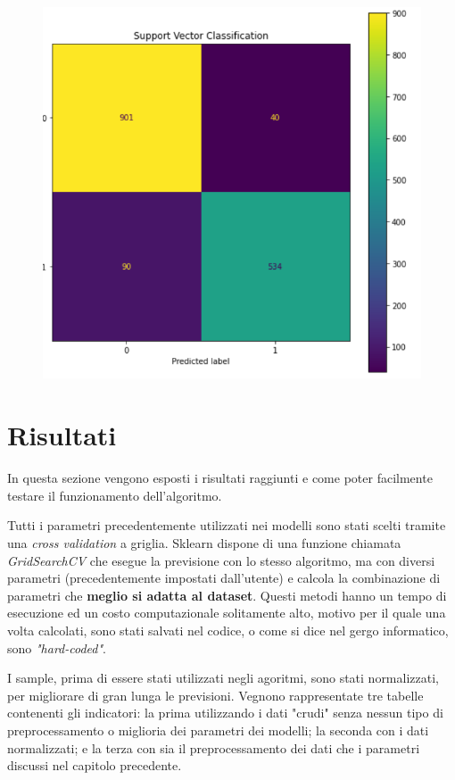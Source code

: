 \documentclass[12pt,a4paper]{article}
\begin{document}
\begin{figure}[th]
\begin{minipage}{0.33\textwidth}
     \caption{}
   \end{minipage}
   \begin{minipage}{0.33\textwidth}
     \centering
     \includegraphics[width=.9\linewidth]{confusion_svc.png}
     \caption{}
   \end{minipage}
\end{figure}

\clearpage
\section{Risultati}
In questa sezione vengono esposti i risultati raggiunti e come poter facilmente testare il funzionamento dell'algoritmo.

Tutti i parametri precedentemente utilizzati nei modelli sono stati scelti tramite una \textit{cross validation} a griglia. Sklearn dispone di una funzione chiamata \textit{GridSearchCV} che esegue la previsione con lo stesso algoritmo, ma con diversi parametri (precedentemente impostati dall'utente) e calcola la combinazione di parametri che \textbf{meglio si adatta al dataset}. Questi metodi hanno un tempo di esecuzione ed un costo computazionale solitamente alto, motivo per il quale una volta calcolati, sono stati salvati nel codice, o come si dice nel gergo informatico, sono \textit{"hard-coded"}.

I sample, prima di essere stati utilizzati negli agoritmi, sono stati normalizzati, per migliorare di gran lunga le previsioni. Vegnono rappresentate tre tabelle contenenti gli indicatori: la prima utilizzando i dati "crudi" senza nessun tipo di preprocessamento o miglioria dei parametri dei modelli; la seconda con i dati normalizzati; e la terza con sia il preprocessamento dei dati che i parametri discussi nel capitolo precedente.
\end{document}
